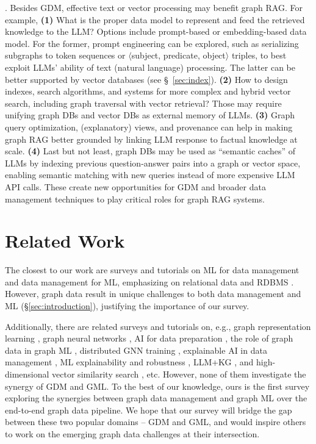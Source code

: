 \documentclass{sig-alternate-10pt}
\newcommand{\spara}[1]{\smallskip\noindent{\bf #1}}
\begin{document}
\spara{Synergy}.
Besides GDM, effective text or vector processing may benefit graph RAG. For example, {\bf (1)} What is the proper data model to represent and feed the retrieved knowledge to the LLM? Options include prompt-based or embedding-based data model.
For the former, prompt engineering can be explored, such as serializing subgraphs to token sequences or $\langle$subject, predicate, object$\rangle$ triples, to best exploit LLMs'
ability of text (natural language) processing.
The latter can be better supported by vector databases (see \S~\ref{sec:index}).
{\bf (2)} How to design indexes, search algorithms, and systems for more complex and hybrid vector search, including graph traversal with vector retrieval? Those may require unifying graph DBs and vector DBs as external memory of LLMs. {\bf (3)} Graph query optimization, (explanatory) views, and provenance can help in making graph RAG
 better grounded by linking LLM response to
 factual knowledge at scale. {\bf (4)} Last but not least,  graph DBs may be used as ``semantic caches'' of LLMs by indexing previous question-answer pairs into a graph or vector space, enabling semantic
matching with new queries instead of more expensive LLM API calls.
These create new opportunities for GDM and broader data management
techniques to play
critical roles for graph RAG systems.


\section{Related Work}
\label{sec:related}

\medskip
\medskip

The closest to our work are surveys and tutorials on ML for data management
and data management for ML, emphasizing on relational
data and RDBMS \cite{ChaiWLNL23,
Kumar0017,Polyzotis0WZ17,HulsebosDSP23}.
However, graph data result in unique challenges to both data management and ML (\S\ref{sec:introduction}), justifying the importance of our survey.


Additionally, there are related surveys and tutorials on, e.g., graph representation learning \cite{CaiZC18,CuiWPZ19}, graph neural networks \cite{WuPCLZY21,ZhangCZ22,ma2021deep}, AI for data preparation \cite{Chai0FL23}, the role of graph data in graph ML \cite{abs-2309-10979}, distributed GNN training \cite{ShaoLGYLMZCC24}, explainable AI in data management \cite{PradhanLGS22}, ML explainability and robustness \cite{DattaFLLSW21}, LLM+KG \cite{PanLWCWW24}, and high-dimensional vector similarity search \cite{EchihabiPZ21}, etc.
However, none of them investigate the synergy of GDM and GML. To the best of our knowledge, ours is the first survey exploring the synergies between graph data management and graph ML over the end-to-end graph data pipeline. We hope that our survey will bridge the gap between these two popular domains -- GDM and GML, and would inspire others to work on the emerging graph data challenges at their intersection.
\end{document}
